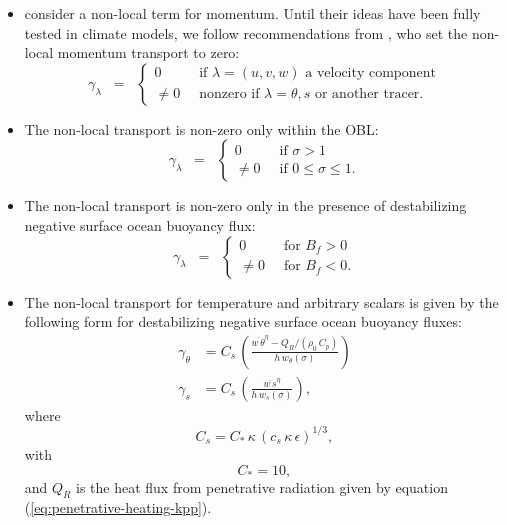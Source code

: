 \begin{itemize}

\item \cite{Smyth_etal2002} consider a non-local term for momentum.
  Until their ideas have been fully tested in climate models, we
  follow recommendations from \citep{LargeKPP}, who set the non-local
  momentum transport to zero:
\begin{equation}
 \gamma_{\lambda} \; \; = \; \; 
\left\{
 \begin{array}{ll}
  0 \; \;  &\mbox{if $\lambda = (u,v,w)$ a velocity component}
 \\
  \ne 0 \; \; &\mbox{nonzero if $\lambda = \theta,s$ or another tracer.}
  \end{array}
 \right.
\end{equation}

  \item The non-local transport is non-zero only within the OBL:  
\begin{equation}
 \gamma_{\lambda} \; \; = \; \; 
  \left\{ 
  \begin{array}{ll}
   0 \; \; &\mbox{if $\sigma > 1$}
   \\ 
   \ne 0  \; \; &\mbox{if $0 \le \sigma \le 1$.}
  \end{array}
 \right.
\end{equation}

  \item The non-local transport is non-zero only in the presence of
    destabilizing negative surface ocean buoyancy flux:
\begin{equation}
 \gamma_{\lambda} \; \; = \; \; 
  \left\{ 
  \begin{array}{ll}
   0 \; \; &\mbox{for $B_{f} > 0$}
   \\ 
   \ne 0 \; \; &\mbox{for $B_{f} < 0$.}
  \end{array}
 \right.
\end{equation}


\item The non-local transport for temperature and arbitrary scalars is
  given by the following form for destabilizing negative surface ocean
  buoyancy fluxes:
\begin{align}
 \gamma_{\theta} &= 
   C_{s} \, \left( \frac{ \overline{w \, \theta}^{\eta} - Q_{R}/(\rho_{0} \, C_{p})  }{h \,  w_{\theta}(\sigma)}  
            \right) 
\label{eq:non-local-temp-kpp}
\\
 \gamma_{s} &= 
   C_{s} \, \left( \frac{ \overline{w \, s}^{\eta} }{h \,  w_{s}(\sigma)}  
            \right), 
\label{eq:non-local-scalar-kpp}
\end{align}
 where 
\begin{equation}
 C_{s} = C_{*} \, \kappa \, (c_{s} \, \kappa \, \epsilon)^{1/3},  
\label{eq:cs-and-cstar-defined}
\end{equation}
with 
\begin{equation}
 C_{*} = 10,
\label{eq:cstar-value-specified}
\end{equation}
and $Q_{R}$ is the heat flux from penetrative radiation given by
equation (\ref{eq:penetrative-heating-kpp}).


\end{itemize}
